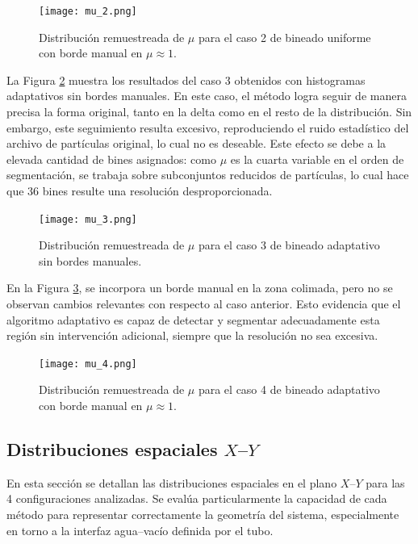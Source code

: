 \begin{figure}[H]
    \centering
    \texttt{[image: mu\_2.png]}
    \caption{Distribución remuestreada de $\mu$ para el caso 2 de bineado uniforme con borde manual en $\mu \approx 1$.}
    \label{fig:mu_2}
\end{figure}

La Figura \ref{fig:mu_3} muestra los resultados del caso 3 obtenidos con histogramas adaptativos sin bordes manuales. En este caso, el método logra seguir de manera precisa la forma original, tanto en la delta como en el resto de la distribución. Sin embargo, este seguimiento resulta excesivo, reproduciendo el ruido estadístico del archivo de partículas original, lo cual no es deseable. Este efecto se debe a la elevada cantidad de bines asignados: como $\mu$ es la cuarta variable en el orden de segmentación, se trabaja sobre subconjuntos reducidos de partículas, lo cual hace que 36 bines resulte una resolución desproporcionada.

\begin{figure}[H]
    \centering
    \texttt{[image: mu\_3.png]}
    \caption{Distribución remuestreada de $\mu$ para el caso 3 de bineado adaptativo sin bordes manuales.}
    \label{fig:mu_3}
\end{figure}

En la Figura \ref{fig:mu_4}, se incorpora un borde manual en la zona colimada, pero no se observan cambios relevantes con respecto al caso anterior. Esto evidencia que el algoritmo adaptativo es capaz de detectar y segmentar adecuadamente esta región sin intervención adicional, siempre que la resolución no sea excesiva.

\begin{figure}[H]
    \centering
    \texttt{[image: mu\_4.png]}
    \caption{Distribución remuestreada de $\mu$ para el caso 4 de bineado adaptativo con borde manual en $\mu \approx 1$.}
    \label{fig:mu_4}
\end{figure}

\subsection{Distribuciones espaciales $X$–$Y$}

En esta sección se detallan las distribuciones espaciales en el plano $X$–$Y$ para las 4 configuraciones analizadas. Se evalúa particularmente la capacidad de cada método para representar correctamente la geometría del sistema, especialmente en torno a la interfaz agua–vacío definida por el tubo.
    
